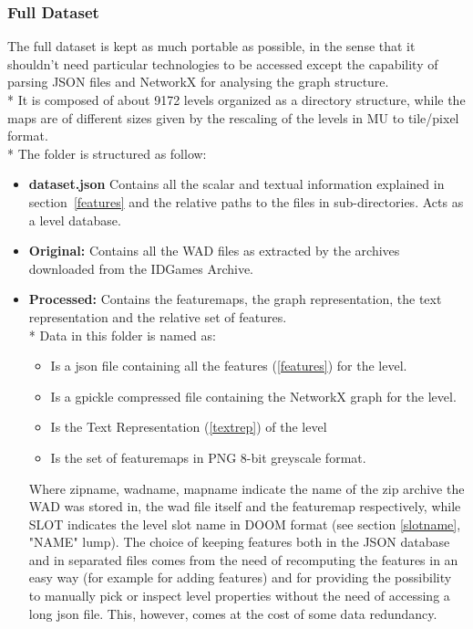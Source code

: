 \subsubsection{Full Dataset} 
 The full dataset is kept as much portable as possible, in the sense that it shouldn't need particular technologies to be accessed except the capability of parsing JSON files and NetworkX \cite{networkx} for analysing the graph structure. \\*
 It is composed of about 9172 levels organized as a directory structure, while the maps are of different sizes given by the rescaling of the levels in \gls{MU} to tile/pixel format.\\*
 The folder is structured as follow:
 \begin{itemize}
 	\item \textbf{dataset.json} Contains all the scalar and textual information explained in section~\ref{features} and the relative paths to the files in sub-directories. Acts as a level database. 
 	\item \textbf{Original:} Contains all the WAD files as extracted by the archives downloaded from the IDGames Archive.
 	\item \textbf{Processed:} Contains the \glspl{featuremap}, the graph representation, the text representation and the relative set of features. \\*
 	Data in this folder is named as:
 	\begin{itemize}
		\item [\textbf{zipname\textunderscore WADNAME\textunderscore SLOT.json}] Is a json file containing all the features (\ref{features}) for the level.
		\item [\textbf{zipname\textunderscore WADNAME\textunderscore SLOT.networkx}] Is a gpickle compressed file containing the NetworkX graph for the level.
		\item [\textbf{zipname\textunderscore WADNAME\textunderscore SLOT.txt}] Is the Text Representation (\ref{textrep}) of the level
		\item [\textbf{zipname\textunderscore WADNAME\textunderscore SLOT\textunderscore mapname.txt}] Is the set of \glspl{featuremap} in PNG 8-bit greyscale format. 
 	\end{itemize}
 	Where zipname, wadname, mapname indicate the name of the zip archive the \gls{WAD} was stored in, the wad file itself and the \gls{featuremap} respectively, while SLOT indicates the level slot name in DOOM format (see section \ref{slotname}, "NAME" lump).
 	The choice of keeping features both in the JSON database and in separated files comes from the need of recomputing the features in an easy way (for example for adding features) and for providing the possibility to manually pick or inspect level properties without the need of accessing a long json file. This, however, comes at the cost of some data redundancy. 
 \end{itemize}


